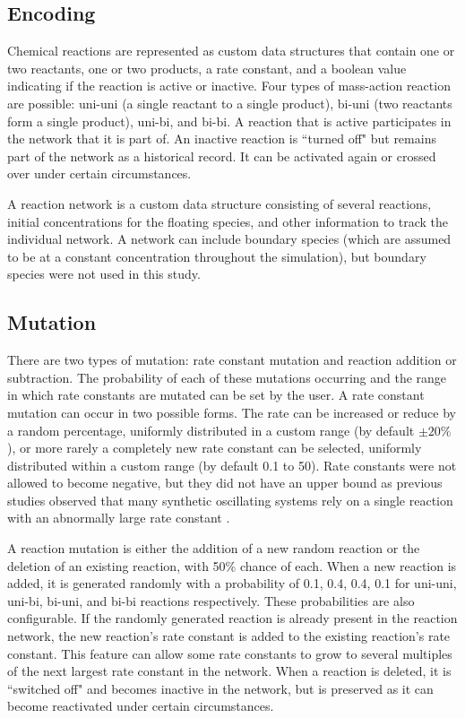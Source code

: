 \documentclass[12pt]{report}
\begin{document}
\subsection{Encoding}
Chemical reactions are represented as custom data structures that contain one or two reactants, one or two products, a rate constant, and a boolean value indicating if the reaction is active or inactive. Four types of mass-action reaction are possible: uni-uni (a single reactant to a single product), bi-uni (two reactants form a single product), uni-bi, and bi-bi. A reaction that is active participates in the network that it is part of. An inactive reaction is ``turned off" but remains part of the network as a historical record. It can be activated again or crossed over under certain circumstances. 

A reaction network is a custom data structure consisting of several reactions, initial concentrations for the floating species, and other information to track the individual network. A network can include boundary species (which are assumed to be at a constant concentration throughout the simulation), but boundary species were not used in this study.

\subsection{Mutation}
\label{section: mutation}
There are two types of mutation: rate constant mutation and reaction addition or subtraction. The probability of each of these mutations occurring and the range in which rate constants are mutated can be set by the user. A rate constant mutation can occur in two possible forms. The rate can be increased or reduce by a random percentage, uniformly distributed in a custom range (by default $\pm20\%$), or more rarely a completely new rate constant can be selected, uniformly distributed within a custom range (by default 0.1 to 50). Rate constants were not allowed to become negative, but they did not have an upper bound as previous studies observed that many synthetic oscillating systems rely on a single reaction with an abnormally large rate constant \cite{Tatka2023}.

A reaction mutation is either the addition of a new random reaction or the deletion of an existing reaction, with 50\% chance of each. When a new reaction is added, it is generated randomly with a 
probability of 0.1, 0.4, 0.4, 0.1 for uni-uni, uni-bi, bi-uni, and bi-bi reactions respectively. These probabilities are also configurable. If the randomly generated reaction is already present in the reaction network, the new reaction's rate constant is added to the existing reaction's rate constant. This feature can allow some rate constants to grow to several multiples of the next largest rate constant in the network. When a reaction is deleted, it is ``switched off" and becomes inactive in the network, but is preserved as it can become reactivated under certain circumstances.
\end{document}
